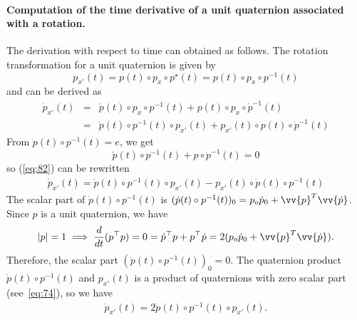 \paragraph{Computation of the time derivative of a unit  quaternion associated with a rotation.}
The derivation with respect to time can obtained as follows. The rotation transformation for a unit quaternion is given by
\begin{equation}
  \label{eq:82}
  p_{x'}(t) = p(t) \circ p_x \circ p^\star(t) =  p(t) \circ p_x \circ p^{-1}(t)
\end{equation}
and can be derived as
\begin{equation}
  \label{eq:83}
  \begin{array}{lcl}
    \dot p_{x'}(t) &=& \dot p(t) \circ p_x \circ p^{-1}(t) + p(t) \circ p_x \circ \dot p^{-1}(t) \\
                  &=& \dot p(t) \circ p^{-1}(t)  \circ   p_{x'}(t)  +      p_{x'}(t) \circ p(t)  \circ \dot p^{-1}(t)    
  \end{array}
\end{equation}
From $p(t) \circ p^{-1}(t) =e$, we get
\begin{equation}
  \label{eq:84}
  \dot p(t) \circ p^{-1}(t) + p \circ \dot p^{-1}(t) = 0
\end{equation}
so (\ref{eq:82}) can be rewritten
\begin{equation}
  \label{eq:85}
  \begin{array}{lcl}
    \dot p_{x'}(t) = \dot p(t) \circ p^{-1}(t)   \circ   p_{x'}(t)  -    p_{x'}(t) \circ  \dot p(t) \circ p^{-1}(t)
  \end{array}
\end{equation}
The scalar part of $\dot p(t) \circ p^{-1}(t)$ is $(\dot p(t) \circ p^{-1}(t))_0 = p_o \dot p_0 + \vv{p}^T\vv{\dot p}$. Since $p$ is a unit quaternion, we have
\begin{equation}
  \label{eq:86}
  |p|=1 \implies \frac{d}{dt} (p^\top p) = 0 =  \dot p^\top p + p^\top \dot p =   2( p_o \dot p_0 + \vv{p}^T\vv{\dot p}).
\end{equation}
Therefore, the scalar part $(\dot p(t) \circ p^{-1}(t))_0 =0$.
The quaternion product $\dot p(t) \circ p^{-1}(t)$ and  $p_{x'}(t)$ is a product of quaternions with zero scalar part (see~\eqref{eq:74}), so we have 
\begin{equation}
  \label{eq:87}
  \begin{array}{lcl}
    \dot p_{x'}(t) = 2 \dot p(t) \circ p^{-1}(t)   \circ p_{x'}(t).
  \end{array}
\end{equation}
